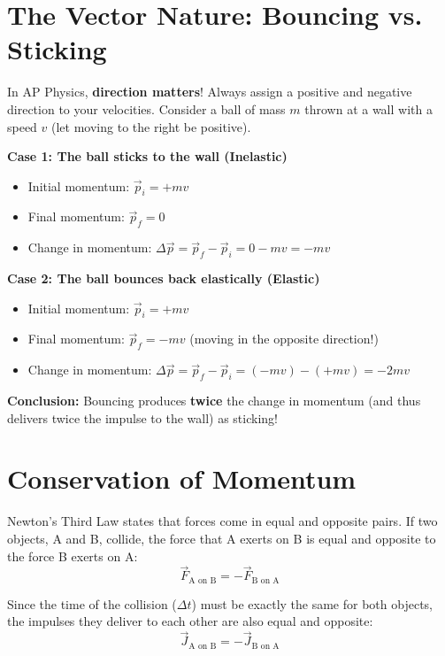 \documentclass{article}
\begin{document}
\section{The Vector Nature: Bouncing vs. Sticking}
In AP Physics, \textbf{direction matters}! Always assign a positive and negative direction to your velocities.
Consider a ball of mass $m$ thrown at a wall with a speed $v$ (let moving to the right be positive).

\begin{tcolorbox}[colback=gray!10, colframe=black, title=Comparison: Bouncing vs Sticking]
    \textbf{Case 1: The ball sticks to the wall (Inelastic)}
    \begin{itemize}
        \item Initial momentum: $\vec{p}_i = +mv$
        \item Final momentum: $\vec{p}_f = 0$
        \item Change in momentum: $\Delta \vec{p} = \vec{p}_f - \vec{p}_i = 0 - mv = -mv$
    \end{itemize}
    
    \vspace{0.3cm}
    \textbf{Case 2: The ball bounces back elastically (Elastic)}
    \begin{itemize}
        \item Initial momentum: $\vec{p}_i = +mv$
        \item Final momentum: $\vec{p}_f = -mv$ (moving in the opposite direction!)
        \item Change in momentum: $\Delta \vec{p} = \vec{p}_f - \vec{p}_i = (-mv) - (+mv) = -2mv$
    \end{itemize}
\end{tcolorbox}
\textbf{Conclusion:} Bouncing produces \textbf{twice} the change in momentum (and thus delivers twice the impulse to the wall) as sticking!

\section{Conservation of Momentum}
Newton's Third Law states that forces come in equal and opposite pairs. If two objects, A and B, collide, the force that A exerts on B is equal and opposite to the force B exerts on A:
\begin{equation}
\vec{F}_{\text{A on B}} = -\vec{F}_{\text{B on A}}
\end{equation}

Since the time of the collision ($\Delta t$) must be exactly the same for both objects, the impulses they deliver to each other are also equal and opposite:
\begin{equation}
\vec{J}_{\text{A on B}} = -\vec{J}_{\text{B on A}}
\end{equation}
\end{document}
